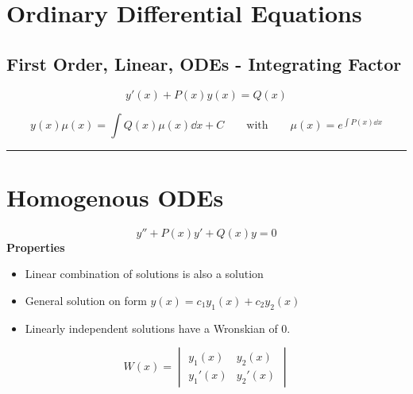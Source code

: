 \documentclass[10pt,a4paper]{article}
\renewcommand{\exp}{e^}
\newcommand{\Holine}{\rule{286pt}{3pt}}
\begin{document}
\begin{multicols}{2}
\section*{Ordinary Differential Equations}




\subsection*{First Order, Linear, ODEs - Integrating Factor}
\[
    y'(x) + P(x) y(x) = Q(x)
\]

\[
    y(x)\mu(x) = \int Q(x)\mu(x) \dd{x} + C \quad\quad\text{with}\quad\quad \mu(x) = \exp{\int P(x)\dd{x}}
\]




\Holine
\section*{Homogenous ODEs}
\[
    y'' + P(x)y' + Q(x)y = 0
\]
\textbf{Properties}
\begin{itemize}
    \item Linear combination of solutions is also a solution
    \item General solution on form $y(x) = c_1 y_1(x) + c_2 y_2(x)$
    \item Linearly independent solutions have a Wronskian of 0.
\end{itemize}
\[
    W(x) = 
    \begin{vmatrix} y_1(x) & y_2(x) \\ y_1'(x) & y_2'(x) \end{vmatrix}
\]



\end{multicols}
\end{document}
